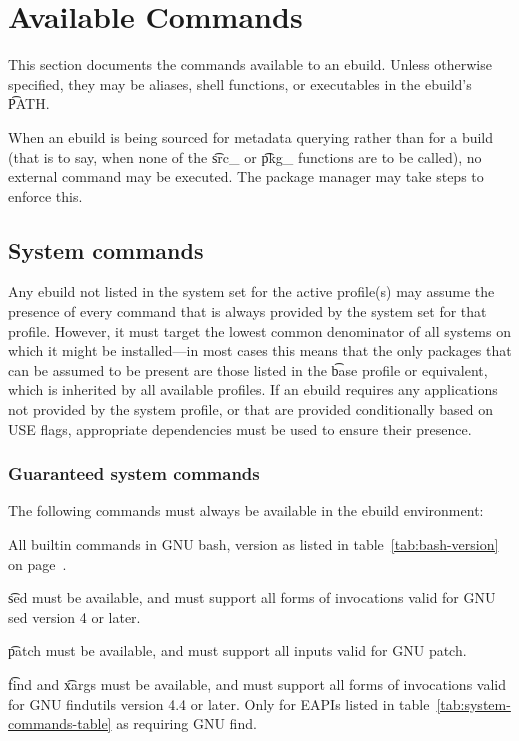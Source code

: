 \section{Available Commands}

This section documents the commands available to an ebuild. Unless otherwise specified, they may be
aliases, shell functions, or executables in the ebuild's \t{PATH}.

When an ebuild is being sourced for metadata querying rather than for a build (that is to say,
when none of the \t{src_} or \t{pkg_} functions are to be called), no external command may
be executed. The package manager may take steps to enforce this.

\subsection{System commands}

Any ebuild not listed in the system set for the active profile(s) may assume the presence of every
command that is always provided by the system set for that profile. However, it must target the
lowest common denominator of all systems on which it might be installed---in most cases this means
that the only packages that can be assumed to be present are those listed in the \t{base} profile or
equivalent, which is inherited by all available profiles. If an ebuild requires any applications not
provided by the system profile, or that are provided conditionally based on USE flags, appropriate
dependencies must be used to ensure their presence.

\subsubsection{Guaranteed system commands}
\label{sec:guaranteed-system-commands}

The following commands must always be available in the ebuild environment:
\begin{compactitem}
\item All builtin commands in GNU bash, version as listed in table~\ref{tab:bash-version} on
    page~\pageref{tab:bash-version}.
\item \t{sed} must be available, and must support all forms of invocations valid for GNU sed
    version 4 or later.
\item \t{patch} must be available, and must support all inputs valid for GNU patch.
\item {} \t{find} and \t{xargs} must be available, and must support all forms
    of invocations valid for GNU findutils version 4.4 or later. Only for EAPIs listed in
    table~\ref{tab:system-commands-table} as requiring GNU find.
\end{compactitem}


